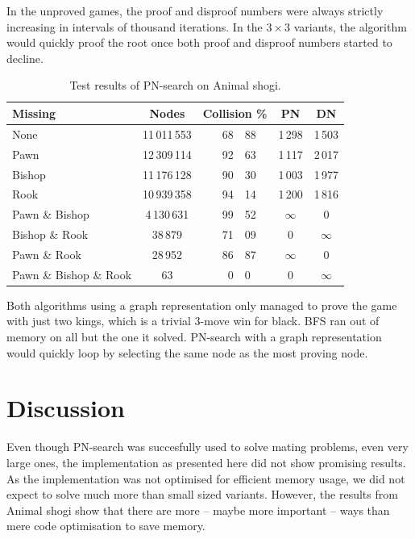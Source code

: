 \documentclass{article}
\begin{document}
In the unproved games, the proof and disproof numbers were always strictly increasing in intervals of thousand iterations. In the $3 \times 3$ variants,
the algorithm would quickly proof the root once both proof and disproof numbers started to decline. \\

\begin{table}
\begin{tabular}{| l | c r@{.}l c c |}
\hline
 Missing & Nodes & \multicolumn{2}{c}{Collision \%} & PN & DN\\ \hline
 None                   & 11\,011\,553  & \quad~68&88 & 1\,298   & 1\,503\\
 Pawn                   & 12\,309\,114  & 92&63 & 1\,117   & 2\,017\\
 Bishop                 & 11\,176\,128  & 90&30 & 1\,003   & 1\,977\\
 Rook                   & 10\,939\,358  & 94&14 & 1\,200   & 1\,816\\
 Pawn \& Bishop         & 4\,130\,631   & 99&52 & $\infty$ & 0\\
 Bishop \& Rook         & 38\,879       & 71&09 & 0        & $\infty$\\
 Pawn \& Rook           & 28\,952       & 86&87 & $\infty$ & 0\\
 Pawn \& Bishop \& Rook & 63            & 0&0      & 0       & $\infty$\\
\hline
\end{tabular}
\caption{Test results of PN-search on Animal shogi.}
\label{animalresult}
\end{table}

Both algorithms using a graph representation only managed to prove the game with just two kings, which is a trivial 3-move win for black. BFS ran out of memory on all
but the one it solved. PN-search with a graph representation would quickly loop by selecting the same node as the most proving node.

\section{Discussion}
\label{sec:disc}

Even though PN-search was succesfully used to solve mating problems, even very large ones, the implementation as presented here did not show promising results. As the implementation
was not optimised for efficient memory usage, we did not expect to solve much more than small sized variants. However, the results from Animal shogi show that there are more -- maybe
more important -- ways than mere code optimisation to save memory.
\end{document}
